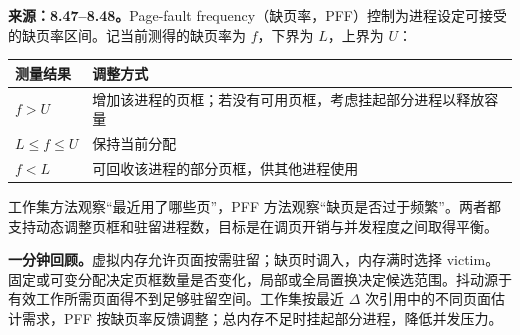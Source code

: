 
\textbf{来源：8.47--8.48。}Page-fault frequency（缺页率，PFF）控制为进程设定可接受的缺页率区间。记当前测得的缺页率为 $f$，下界为 $L$，上界为 $U$：
\begin{center}
\begin{tabularx}{\textwidth}{@{}l>{\raggedright\arraybackslash}X@{}}
\toprule
测量结果 & 调整方式 \\
\midrule
$f>U$ & 增加该进程的页框；若没有可用页框，考虑挂起部分进程以释放容量 \\
$L\leq f\leq U$ & 保持当前分配 \\
$f<L$ & 可回收该进程的部分页框，供其他进程使用 \\
\bottomrule
\end{tabularx}
\end{center}
工作集方法观察“最近用了哪些页”，PFF 方法观察“缺页是否过于频繁”。两者都支持动态调整页框和驻留进程数，目标是在调页开销与并发程度之间取得平衡。

\textbf{一分钟回顾。}虚拟内存允许页面按需驻留；缺页时调入，内存满时选择 victim。固定或可变分配决定页框数量是否变化，局部或全局置换决定候选范围。抖动源于有效工作所需页面得不到足够驻留空间。工作集按最近 $\Delta$ 次引用中的不同页面估计需求，PFF 按缺页率反馈调整；总内存不足时挂起部分进程，降低并发压力。
\endgroup
